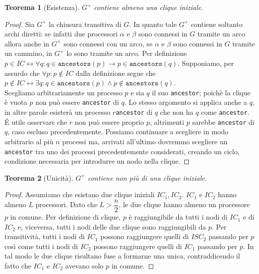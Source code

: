 \documentclass{article}
\newtheorem{teorema}{Teorema}
\begin{document}
\begin{teorema}[Esistenza]$G^+$ contiene almeno una clique iniziale.\end{teorema}
\begin{proof}
Sia $G^+$ la chiusura transitiva di $G$. In quanto tale $G^+$ contiene soltanto archi diretti: se infatti due processori $\alpha$ e $\beta$ sono connessi in $G$ tramite un arco allora anche in $G^+$ sono connessi con un arco, se $\alpha$ e $\beta$ sono connessi in $G$ tramite un cammino, in $G^+$ lo sono tramite un arco. Per definizione $p\in IC\leftrightarrow\forall q: q\in\texttt{ancestors}(p)\rightarrow p\in\texttt{ancestors}(q)$. Supponiamo, per assurdo che $\forall p: p\not\in IC$ dalla definizione segue che $p\not\in IC\leftrightarrow\exists q: q\in\texttt{ancestors}(p)\wedge p\not\in\texttt{ancestors}(q)$.\\
Scegliamo arbitrariamente un processo $p$ e sia $q$ il suo \texttt{ancestor}; poichè la clique è vuota $p$ non può essere \texttt{ancestor} di $q$. Lo stesso argomento si applica anche a $q$, in altre parole esisterà un processo $r$\texttt{ancestor} di $q$ che non ha $q$ come \texttt{ancestor}. \'E utile osservare che $r$ non può essere proprio $p$, altrimenti $p$ sarebbe \texttt{ancestor} di $q$, caso escluso precedentemente. Possiamo continuare a scegliere in modo arbitrario al più $n$ processi ma, arrivati all'ultimo dovremmo scegliere un \texttt{ancestor} tra uno dei processi precedentemente considerati, creando un ciclo, condizione necessaria per introdurre un nodo nella clique. 
\end{proof}

\begin{teorema}[Unicità]$G^+$ contiene non più di una clique iniziale.\end{teorema}
\begin{proof}
Assumiamo che esistano due clique iniziali $IC_1, IC_2$.
$IC_1$ e $IC_2$ hanno almeno $L$ processori. Dato che $L>\dfrac{n}{2}$, le due clique hanno almeno un processore $p$ in comune. Per definizione di clique, $p$ è raggiungibile da tutti i nodi di $IC_1$ e di $IC_2$ e, viceversa, tutti i nodi delle due clique sono raggiungibili da $p$. Per transitività, tutti i nodi di $IC_1$ possono raggiungere quelli di $ISC_2$ passando per $p$ così come tutti i nodi di $IC_2$ possono raggiungere quelli di $IC_1$ passando per $p$. In tal modo le due clique risultano fuse a formarne una unica, contraddicendo il fatto che $IC_1$ e $IC_2$ avevano solo $p$ in comune. 
\end{proof}
\end{document}
